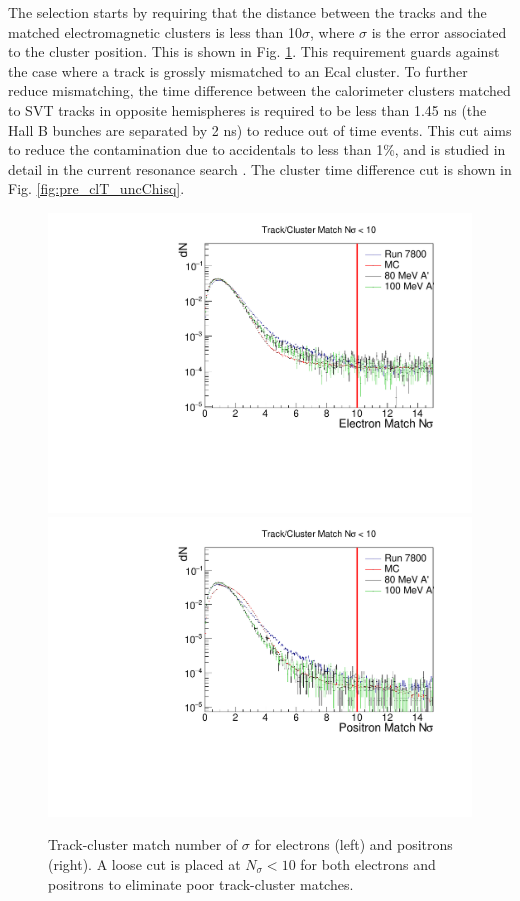 The selection starts by requiring that the distance between the tracks and the matched electromagnetic clusters is less than 10$\sigma$, where $\sigma$ is the error associated to the cluster position. This is shown in Fig. \ref{fig:pre_matchChisq}. This requirement guards against the case where a track is grossly mismatched to an Ecal cluster. To further reduce mismatching, the time difference between the calorimeter clusters matched to SVT tracks in opposite hemispheres is required to be less than 1.45 ns (the Hall B bunches are separated by 2 ns) to reduce out of time events. This cut aims to reduce the contamination due to accidentals to less than 1\%, and is studied in detail in the current resonance search \cite{adrian2018search}. The cluster time difference cut is shown in Fig. \ref{fig:pre_clT_uncChisq}.

\begin{figure}[t]
    \centering
    \includegraphics[width=.45\textwidth]{figs/recon/pre_eleMatchChisq.pdf}
    \includegraphics[width=.45\textwidth]{figs/recon/pre_posMatchChisq.pdf}
    \caption{Track-cluster match number of $\sigma$ for electrons (left) and positrons (right). A loose cut is placed at $N_{\sigma}<10$ for both electrons and positrons to eliminate poor track-cluster matches.}
    \label{fig:pre_matchChisq}
\end{figure}

